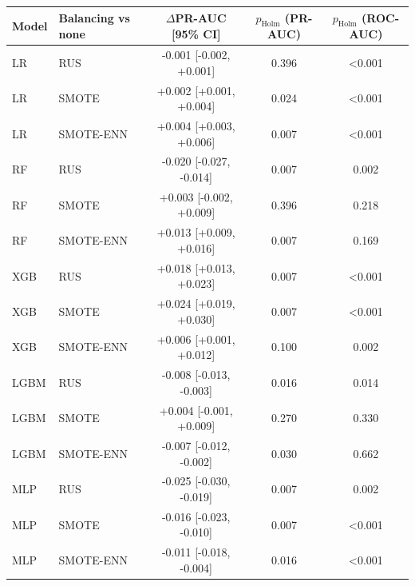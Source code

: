 \begin{tabular}{llccc}
\hline
Model & Balancing vs none & $\Delta$PR-AUC [95\% CI] & $p_{\mathrm{Holm}}$ (PR-AUC) & $p_{\mathrm{Holm}}$ (ROC-AUC) \\
\hline
LR & RUS & -0.001 [-0.002, +0.001] & 0.396 & <0.001 \\
LR & SMOTE & +0.002 [+0.001, +0.004] & 0.024 & <0.001 \\
LR & SMOTE-ENN & +0.004 [+0.003, +0.006] & 0.007 & <0.001 \\
RF & RUS & -0.020 [-0.027, -0.014] & 0.007 & 0.002 \\
RF & SMOTE & +0.003 [-0.002, +0.009] & 0.396 & 0.218 \\
RF & SMOTE-ENN & +0.013 [+0.009, +0.016] & 0.007 & 0.169 \\
XGB & RUS & +0.018 [+0.013, +0.023] & 0.007 & <0.001 \\
XGB & SMOTE & +0.024 [+0.019, +0.030] & 0.007 & <0.001 \\
XGB & SMOTE-ENN & +0.006 [+0.001, +0.012] & 0.100 & 0.002 \\
LGBM & RUS & -0.008 [-0.013, -0.003] & 0.016 & 0.014 \\
LGBM & SMOTE & +0.004 [-0.001, +0.009] & 0.270 & 0.330 \\
LGBM & SMOTE-ENN & -0.007 [-0.012, -0.002] & 0.030 & 0.662 \\
MLP & RUS & -0.025 [-0.030, -0.019] & 0.007 & 0.002 \\
MLP & SMOTE & -0.016 [-0.023, -0.010] & 0.007 & <0.001 \\
MLP & SMOTE-ENN & -0.011 [-0.018, -0.004] & 0.016 & <0.001 \\
\hline
\end{tabular}
